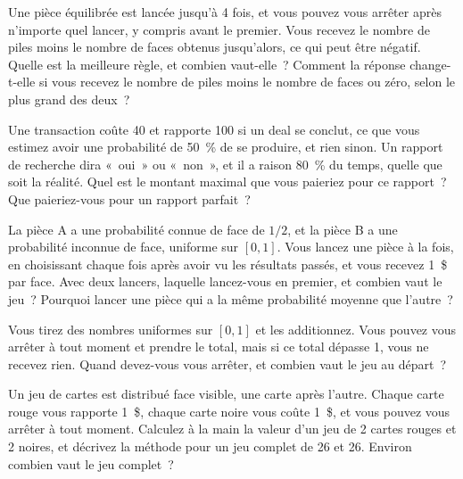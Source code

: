 \begin{question}\label{iq:iv1:optimal-stopping:10}
Une pièce équilibrée est lancée jusqu'à 4 fois, et vous pouvez vous arrêter après n'importe quel lancer, y compris avant le premier. Vous recevez le nombre de piles moins le nombre de faces obtenus jusqu'alors, ce qui peut être négatif. Quelle est la meilleure règle, et combien vaut-elle~? Comment la réponse change-t-elle si vous recevez le nombre de piles moins le nombre de faces ou zéro, selon le plus grand des deux~?
\end{question}

\begin{question}\label{iq:iv1:optimal-stopping:11}
Une transaction coûte 40 et rapporte 100 si un deal se conclut, ce que vous estimez avoir une probabilité de 50~\% de se produire, et rien sinon. Un rapport de recherche dira «~oui~» ou «~non~», et il a raison 80~\% du temps, quelle que soit la réalité. Quel est le montant maximal que vous paieriez pour ce rapport~? Que paieriez-vous pour un rapport parfait~?
\end{question}

\begin{question}\label{iq:iv1:optimal-stopping:12}
La pièce A a une probabilité connue de face de $1/2$, et la pièce B a une probabilité inconnue de face, uniforme sur $[0, 1]$. Vous lancez une pièce à la fois, en choisissant chaque fois après avoir vu les résultats passés, et vous recevez 1~\$ par face. Avec deux lancers, laquelle lancez-vous en premier, et combien vaut le jeu~? Pourquoi lancer une pièce qui a la même probabilité moyenne que l'autre~?
\end{question}

\begin{question}\label{iq:iv1:optimal-stopping:13}
Vous tirez des nombres uniformes sur $[0, 1]$ et les additionnez. Vous pouvez vous arrêter à tout moment et prendre le total, mais si ce total dépasse 1, vous ne recevez rien. Quand devez-vous vous arrêter, et combien vaut le jeu au départ~?
\end{question}

\begin{question}\label{iq:iv1:optimal-stopping:14}
Un jeu de cartes est distribué face visible, une carte après l'autre. Chaque carte rouge vous rapporte 1~\$, chaque carte noire vous coûte 1~\$, et vous pouvez vous arrêter à tout moment. Calculez à la main la valeur d'un jeu de 2 cartes rouges et 2 noires, et décrivez la méthode pour un jeu complet de 26 et 26. Environ combien vaut le jeu complet~?
\end{question}

